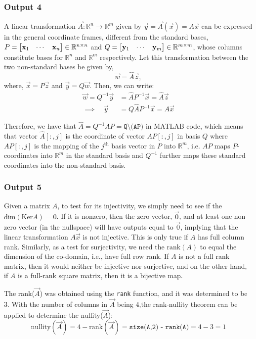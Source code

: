 \documentclass[10pt]{article}
\begin{document}
\subsubsection{Output 4}
A linear transformation $\vec{A} : \mathbb{R}^n \rightarrow \mathbb{R}^m$ given by $\vec{y} = \vec{A}(\vec{x}) = A\vec{x}$ can be expressed in the general coordinate frames, different from the standard bases, $P = \begin{bmatrix} \mathbf{x}_1 & \cdots & \mathbf{x}_n \end{bmatrix} \in \mathbb{R}^{n\times n}$ and $Q = \begin{bmatrix} \mathbf{y}_1 & \cdots & \mathbf{y}_m \end{bmatrix} \in \mathbb{R}^{m\times m}$, whose columns constitute bases for $\mathbb{R}^n$ and $\mathbb{R}^m$ respectively. Let this transformation between the two non-standard bases be given by,
\[
    \vec{w}=\hat{A}\vec{z},
\]
where, $\vec{x}=P\vec{z}$ and $\vec{y} = Q\vec{w}$. Then, we can write:
\begin{align*}
    \vec{w} = Q^{-1}\vec{y} &= \hat{A}P^{-1}\vec{x} = \hat{A}\vec{z}\\
    \implies \quad \vec{y} &= Q\hat{A}P^{-1}\vec{x} = A\vec{x}
\end{align*}

Therefore, we have that $\hat{A} = Q^{-1}AP=\texttt{Q\textbackslash (AP)}$ in \textsc{MATLAB} code, which means that vector ${\hat{A}}[:, j]$ is the coordinate of vector $AP[:, j]$ in basis $Q$ where $AP[:, j]$ is the mapping of the $j^{\text{th}}$ basis vector in $P$ into $\mathbb{R}^m$, i.e. $AP$ maps $P$-coordinates into $\mathbb{R}^m$ in the standard basis and $Q^{-1}$ further maps these standard coordinates into the non-standard basis.

\subsubsection{Output 5}
Given a matrix $A$, to test for its injectivity, we simply need to see if the $\text{dim}(\text{Ker}A) = 0$. If it is nonzero, then the zero vector, $\vec{0}$, and at least one non-zero vector (in the nullspace) will have outputs equal to $\vec{0}$, implying that the linear transformation $A\vec{x}$ is not injective. This is only true if $A$ has full column rank. Similarly, as a test for surjectivity, we need the $\text{rank}(A)$ to equal the dimension of the co-domain, i.e., have full row rank. If $A$ is not a full rank matrix, then it would neither be injective nor surjective, and on the other hand, if $A$ is a full-rank square matrix, then it is a bijective map.

The rank($\vec{A}$) was obtained using the \texttt{rank} function, and it was determined to be $3$. With the number of columns in $\vec{A}$ being $4$,the rank-nullity theorem can be applied to determine the nullity($\vec{A}$):
\begin{equation*}
    \text{nullity}(\vec{A}) = 4 - \text{rank}(\vec{A}) = \texttt{size(A,2) - rank(A)}= 4 - 3 = 1
\end{equation*}
\end{document}
